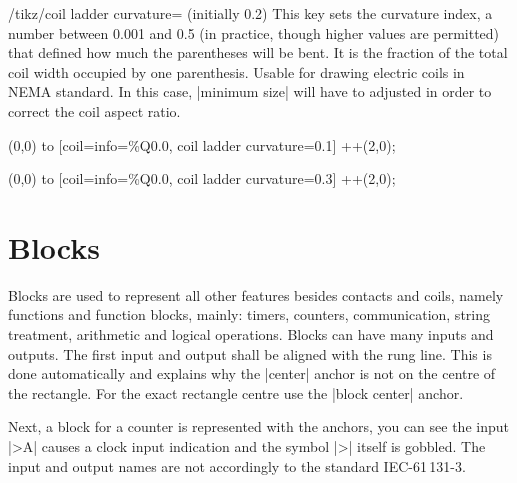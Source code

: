 \documentclass[a4paper]{ltxdoc}
\begin{document}
\begin{key}{/tikz/coil ladder curvature= (initially 0.2)}
This key sets the curvature index, a number between 0.001 and 0.5 (in practice, though higher values are permitted) that defined how much the parentheses will be bent. It is the fraction of the total coil width occupied by one parenthesis. Usable for drawing electric coils in NEMA standard. In this case, |minimum size| will have to adjusted in order to correct the coil aspect ratio.
\begin{codeexample}[width=2.3cm,leave comments]
  \draw(0,0) to [coil={info={\%Q0.0},
    coil ladder curvature=0.1}] ++(2,0);
\end{codeexample}
\begin{codeexample}[width=2.3cm,leave comments]
  \draw(0,0) to [coil={info={\%Q0.0},
    coil ladder curvature=0.3}] ++(2,0);
\end{codeexample}
\end{key}


\section{Blocks}

Blocks are used to represent all other features besides contacts and coils, namely functions and function blocks, mainly: timers, counters, communication, string treatment, arithmetic and logical operations. Blocks can have many inputs and outputs. The first input and output shall be aligned with the rung line. This is done automatically and explains why the |center| anchor is not on the centre of the rectangle. For the exact rectangle centre use the |block center| anchor.

Next, a block for a counter is represented with the anchors, you can see the input |>A| causes a clock input indication and the symbol |>| itself is gobbled. The input and output names are not accordingly to the standard IEC-61\,131-3.

\begin{codeexample}[]
\Huge
{}
\end{codeexample}
\end{document}
